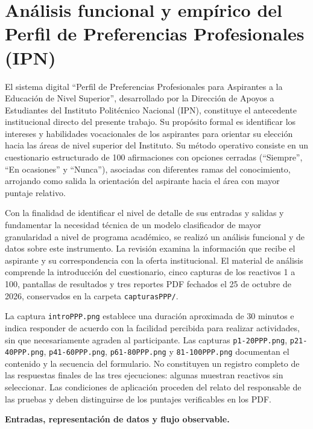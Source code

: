 \section{Análisis funcional y empírico del Perfil de Preferencias Profesionales (IPN)}
\label{sec:analisis-ppp}

El sistema digital ``Perfil de Preferencias Profesionales para Aspirantes a la Educación de Nivel Superior'', desarrollado por la Dirección de Apoyos a Estudiantes del Instituto Politécnico Nacional (IPN), constituye el antecedente institucional directo del presente trabajo. Su propósito formal es identificar los intereses y habilidades vocacionales de los aspirantes para orientar su elección hacia las áreas de nivel superior del Instituto. Su método operativo consiste en un cuestionario estructurado de 100 afirmaciones con opciones cerradas (``Siempre'', ``En ocasiones'' y ``Nunca''), asociadas con diferentes ramas del conocimiento, arrojando como salida la orientación del aspirante hacia el área con mayor puntaje relativo.

Con la finalidad de identificar el nivel de detalle de sus entradas y salidas y fundamentar la necesidad técnica de un modelo clasificador de mayor granularidad a nivel de programa académico, se realizó un análisis funcional y de datos sobre este instrumento. La revisión examina la información que recibe el aspirante y su correspondencia con la oferta institucional. El material de análisis comprende la introducción del cuestionario, cinco capturas de los reactivos 1 a 100, pantallas de resultados y tres reportes PDF fechados el 25 de octubre de 2026, conservados en la carpeta \nolinkurl{capturasPPP/}.

La captura \nolinkurl{introPPP.png} establece una duración aproximada de 30 minutos e indica responder de acuerdo con la facilidad percibida para realizar actividades, sin que necesariamente agraden al participante. Las capturas \nolinkurl{p1-20PPP.png}, \nolinkurl{p21-40PPP.png}, \nolinkurl{p41-60PPP.png}, \nolinkurl{p61-80PPP.png} y \nolinkurl{81-100PPP.png} documentan el contenido y la secuencia del formulario. No constituyen un registro completo de las respuestas finales de las tres ejecuciones: algunas muestran reactivos sin seleccionar. Las condiciones de aplicación proceden del relato del responsable de las pruebas y deben distinguirse de los puntajes verificables en los PDF.

\noindent\textbf{Entradas, representación de datos y flujo observable.}\par\smallskip

